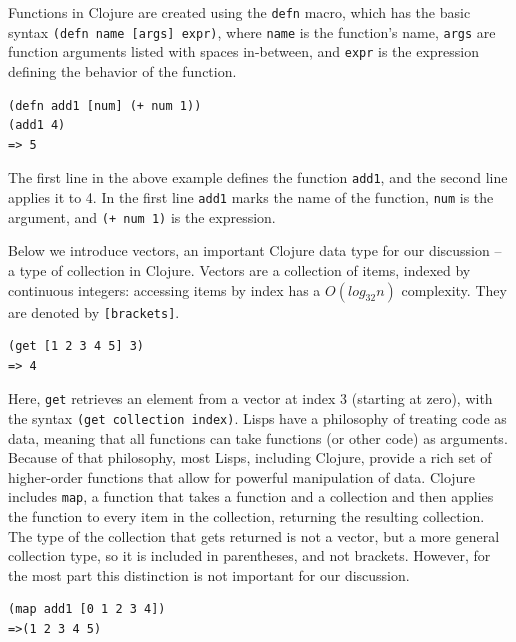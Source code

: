 \documentclass[12pt]{article}
\newcommand{\comment}[1]{{\bf \tt  {#1}}}
\newcommand{\emcomment}[1]{\textcolor{ForestGreen}{\comment{Elena: {#1}}}}
\newcommand{\clocode}[1]{{\texttt {#1}}}
\begin{document}
Functions in Clojure are created using the \clocode{defn} macro, which has the basic syntax \clocode{(defn name [args] expr)}, where \clocode{name} is the function's name, \clocode{args} are function arguments listed with spaces in-between, and \clocode{expr} is the expression defining the behavior of the function. 
\begin{verbatim}
(defn add1 [num] (+ num 1))
(add1 4)
=> 5
\end{verbatim} 
The first line in the above example defines the function \clocode{add1}, and the second line applies it to 4. In the first line \clocode{add1} marks the name of the function, \clocode{num} is the argument, and \clocode{(+ num 1)} is the expression.

Below we introduce vectors, an important Clojure data type for our discussion -- a type of collection in Clojure. Vectors are a collection of items, indexed by continuous integers: accessing items by index has a $O(log_{32}n)$  complexity. They are denoted by 
\clocode{[brackets]}.
\begin{verbatim}
(get [1 2 3 4 5] 3)
=> 4
\end{verbatim}
Here, \clocode{get} retrieves an element from a vector at index 3 (starting at zero), with the syntax \clocode{(get collection index)}.
Lisps have a philosophy of treating code as data, meaning that all functions can take functions (or other code) as arguments. Because of that philosophy, most Lisps, including Clojure, provide a rich set of higher-order functions that allow for powerful manipulation of data. Clojure includes \clocode{map}, a function that takes a function and a collection and then applies the function to every item in the collection, returning the resulting collection. The type of the collection that gets returned is not a vector, but a more general collection type, so it is included in parentheses, and not brackets. However, for the most part this distinction is not important for our discussion. 
\begin{verbatim}
(map add1 [0 1 2 3 4])
=>(1 2 3 4 5)
\end{verbatim}
\end{document}
